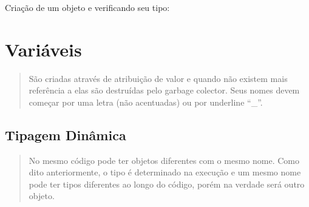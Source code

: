 \documentclass[letterpaper,10pt,brazil]{sphinxmanual}
\begin{document}
Criação de um objeto e verificando seu tipo:

\begin{sphinxVerbatim}[commandchars=\\\{\}]
  

\end{sphinxVerbatim}

\begin{sphinxVerbatim}[commandchars=\\\{\}]
\end{sphinxVerbatim}


\section{Variáveis}
\label{\detokenize{content/data_types:variaveis}}\begin{quote}

São criadas através de atribuição de valor e quando não existem mais referência a elas são destruídas pelo garbage colector.
Seus nomes devem começar por uma letra (não acentuadas) ou por underline “\_”.
\end{quote}


\subsection{Tipagem Dinâmica}
\label{\detokenize{content/data_types:tipagem-dinamica}}\begin{quote}

No mesmo código pode ter objetos diferentes com o mesmo nome.
Como dito anteriormente, o tipo é determinado na execução e um mesmo nome pode ter tipos diferentes ao longo do código, porém na verdade será outro objeto.
\end{quote}

\begin{sphinxVerbatim}[commandchars=\\\{\}]
  

\end{sphinxVerbatim}

\begin{sphinxVerbatim}[commandchars=\\\{\}]
\end{sphinxVerbatim}
\end{document}
